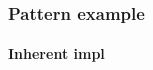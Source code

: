 \begin{frame}[noframenumbering]
	\frametitle{Pattern example}
	\framesubtitle{Inherent impl}

	\begin{figure}[h!]
	\end{figure}

\end{frame}